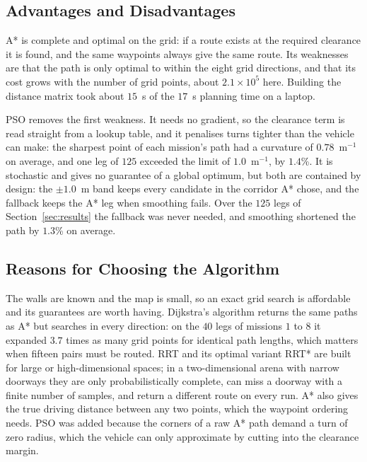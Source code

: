 \subsection{Advantages and Disadvantages}
A* is complete and optimal on the grid: if a route exists at the
required clearance it is found, and the same waypoints always give the
same route. Its weaknesses are that the path is only optimal to within
the eight grid directions, and that its cost grows with the number of
grid points, about $2.1 \times 10^{5}$ here. Building the distance
matrix took about $15$~s of the $17$~s planning time on a laptop.

PSO removes the first weakness. It needs no gradient, so the clearance
term is read straight from a lookup table, and it penalises turns
tighter than the vehicle can make: the sharpest point of each mission's
path had a curvature of $0.78$~m$^{-1}$ on average, and one leg of $125$
exceeded the limit of $1.0$~m$^{-1}$, by $1.4$\%. It is stochastic and gives no guarantee of a global
optimum, but both are contained by design: the $\pm 1.0$~m band keeps
every candidate in the corridor A* chose, and the fallback keeps the A*
leg when smoothing fails. Over the $125$ legs of
Section~\ref{sec:results} the fallback was never needed, and smoothing
shortened the path by $1.3$\% on average.

\subsection{Reasons for Choosing the Algorithm}
The walls are known and the map is small, so an exact grid search is
affordable and its guarantees are worth having. Dijkstra's algorithm
returns the same paths as A* but searches in every direction: on the
$40$ legs of missions $1$ to $8$ it expanded $3.7$ times as many grid
points for identical path lengths, which matters when fifteen pairs must
be routed. RRT and its optimal
variant RRT* are built for large or high-dimensional
spaces; in a two-dimensional arena with narrow doorways they are only
probabilistically complete, can miss a doorway with a finite number of
samples, and return a different route on every run. A* also gives the
true driving distance between any two points, which the waypoint
ordering needs. PSO was added because the corners of a raw A* path
demand a turn of zero radius, which the vehicle can only approximate by
cutting into the clearance margin.

